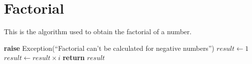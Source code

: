 \documentclass{report}
\begin{document}
\section{Factorial}
\begin{flushleft}
This is the algorithm used to obtain the factorial of a number.
\end{flushleft}
\begin{algorithmic}[1]
    \State \textbf{raise} Exception(``Factorial can't be calculated for negative numbers'')
  \EndIf
  \State $result \gets 1$
    \State $result \gets result \times i$
  \EndFor
  \State \textbf{return} $result$
\EndFunction
\end{algorithmic}



\printindex
\end{document}
